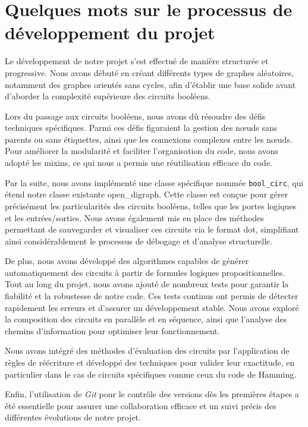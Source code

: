 \documentclass[a4paper,12pt]{article}
\begin{document}
\section{Quelques mots sur le processus de développement du projet}

Le développement de notre projet s'est effectué de manière structurée et
progressive. Nous avons débuté en créant différents types de graphes
aléatoires, notamment des graphes orientés sans cycles, afin d'établir une base
solide avant d'aborder la complexité supérieure des circuits booléens.

Lors du passage aux circuits booléens, nous avons dû résoudre des défis
techniques spécifiques. Parmi ces défis figuraient la gestion des nœuds sans
parents ou sans étiquettes, ainsi que les connexions complexes entre les nœuds.
Pour améliorer la modularité et faciliter l’organisation du code, nous avons
adopté les mixins, ce qui nous a permis une réutilisation efficace du code.

Par la suite, nous avons implémenté une classe spécifique nommée \texttt{bool\_circ},
qui étend notre classe existante open\_digraph. Cette classe est conçue pour
gérer précisément les particularités des circuits booléens, telles que les
portes logiques et les entrées/sorties. Nous avons également mis en place des
méthodes permettant de sauvegarder et visualiser ces circuits via le format
dot, simplifiant ainsi considérablement le processus de débogage et d'analyse
structurelle.

De plus, nous avons développé des algorithmes capables de générer
automatiquement des circuits à partir de formules logiques propositionnelles.
Tout au long du projet, nous avons ajouté de nombreux tests pour garantir la
fiabilité et la robustesse de notre code. Ces tests continus ont permis de
détecter rapidement les erreurs et d'assurer un développement stable. Nous
avons exploré la composition des circuits en parallèle et en séquence, ainsi
que l’analyse des chemins d'information pour optimiser leur fonctionnement.

Nous avons intégré des méthodes d'évaluation des circuits par l'application de
règles de réécriture et développé des techniques pour valider leur exactitude,
en particulier dans le cas de circuits spécifiques comme ceux du code de
Hamming.

Enfin, l'utilisation de \textit{Git} pour le contrôle des versions dès les premières
étapes a été essentielle pour assurer une collaboration efficace et un suivi
précis des différentes évolutions de notre projet.
\end{document}
